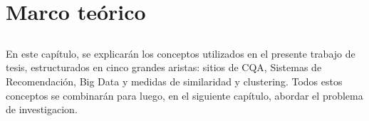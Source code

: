 \chapter*{Marco teórico}\label{ch:marcoteorico}

\section*{}
\addtocounter{section}{1}
\setcounter{subsection}{0}

En este capítulo, se explicarán los conceptos utilizados en el presente trabajo de tesis, estructurados en cinco grandes aristas: sitios de CQA, Sistemas de Recomendación, Big Data y medidas de similaridad y clustering. Todos estos conceptos se combinarán para luego, en el siguiente capítulo, abordar el problema de investigacion.








